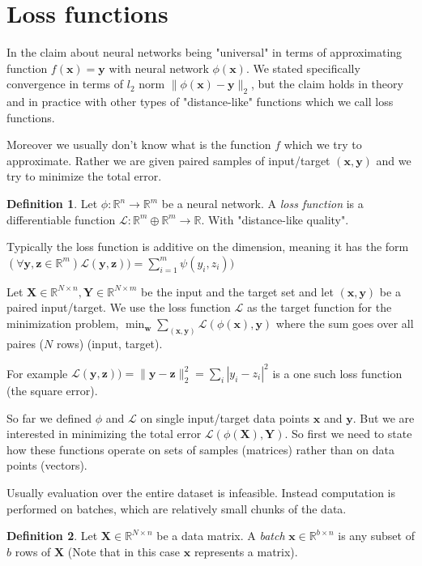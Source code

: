 \documentclass[11pt, a4paper]{report}
\theoremstyle{plain}
\theoremstyle{definition}
\newtheorem{mydef}{Definition}[chapter]
\theoremstyle{remark}
\newcommand{\R}{\mathbb{R}}
\newcommand{\X}{\mathbf{X}}
\newcommand{\x}{\mathbf{x}}
\newcommand{\z}{\mathbf{z}}
\newcommand{\Y}{\mathbf{Y}}
\newcommand{\y}{\mathbf{y}}
\newcommand{\w}{\mathbf{w}}
\newcommand{\bv}[1]{\boldsymbol{#1}}
\begin{document}
\section{Loss functions}

In the claim about neural networks being "universal" in terms of approximating
function $f(\x)=\y$ with neural network $\phi(\x)$. We stated specifically
convergence in terms of $l_2$ norm
$\|\phi(\x) - \y \|_2$, but the claim holds in theory and in
practice with other types of "distance-like" functions which we call loss
functions.

Moreover we usually don't know what is the function $f$ which we try to
approximate. Rather we are given 
paired samples of input/target $(\x, \y)$ and we
try to minimize the total error.

\begin{mydef}
\label{def:lossfunc}
Let $\phi :\R^n \to \R^m$ be a neural network.
A \textit{loss function} is a differentiable
function $\mathcal{L} : \R^{m}\oplus\R^m \to \R$. 
With "distance-like quality".
\end{mydef}

Typically the loss function is additive on the dimension, meaning it has the
form $(\forall \y,\z \in \R^m) \mathcal{L}(\y, \z)) = \sum_{i=1}^m \psi(y_i,
z_i))$

Let $\X \in \R^{N \times n}, \Y \in \R^{N \times m}$ be the input and the target
set and let $(\x,\y)$ be a paired input/target. 
We use the loss function $\mathcal{L}$ as the target function for 
the minimization problem,
 $\min_{\w} \sum_{(\x,\y)}\mathcal{L}(\phi(\x), \y)$ where the sum goes over all
paires ($N$ rows)  (input, target).


For example
$\mathcal{L}(\y, \z)) = \|\y - \z\|_2^2 = 
\sum_i |y_i - z_i|^2$ is a one such loss function (the
square error).

So far we defined $\phi$ and $\mathcal{L}$ on single input/target data points
$\x$ and $\y$. But we are interested in minimizing the total error
$\mathcal{L}(\phi(\X),\Y)$. So first we need to state how these functions
operate on sets of samples (matrices) rather than on data points (vectors).

Usually evaluation over the entire dataset is infeasible. Instead computation is
performed on batches, which are relatively small chunks of the data.

\begin{mydef}
\label{def:batch}
Let $\bv{X} \in  \R^{N \times n}$ be a data matrix. A \emph{batch}
$\bv{x} \in \R^{b \times n}$ is any subset of $b$ rows of $\bv{X}$
(Note that in this case $\x$ represents a matrix).
\end{mydef}
\end{document}
